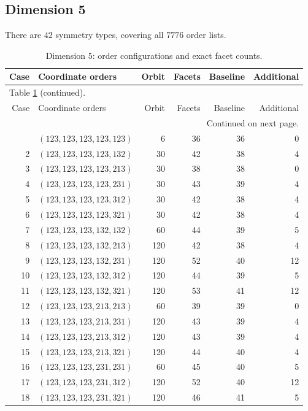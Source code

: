 \documentclass[a4paper,11pt]{amsart}
\numberwithin{equation}{section}
\theoremstyle{definition}
\theoremstyle{remark}
\begin{document}
\subsection{Dimension 5}\label{app:tables-n5}
There are $ 42$ symmetry types, covering all $ 7776$ order lists.
{\small\setlength{\tabcolsep}{4.5pt}
\begin{longtable}{@{}rlrrrr@{}}
\caption{Dimension $ 5$: order configurations and exact facet counts.}\label{tab:counts-n5}\\
\toprule
Case & Coordinate orders & Orbit & Facets & Baseline & Additional\\
\midrule\endfirsthead
\multicolumn{6}{l}{\small Table \ref{tab:counts-n5} (continued).}\\
\toprule
Case & Coordinate orders & Orbit & Facets & Baseline & Additional\\
\midrule\endhead
\midrule
\multicolumn{6}{r}{\small Continued on next page.}\\
\endfoot\bottomrule\endlastfoot
1 & $(123,123,123,123,123)$ & 6 & 36 & 36 & 0\\
2 & $(123,123,123,123,132)$ & 30 & 42 & 38 & 4\\
3 & $(123,123,123,123,213)$ & 30 & 38 & 38 & 0\\
4 & $(123,123,123,123,231)$ & 30 & 43 & 39 & 4\\
5 & $(123,123,123,123,312)$ & 30 & 42 & 38 & 4\\
6 & $(123,123,123,123,321)$ & 30 & 42 & 38 & 4\\
7 & $(123,123,123,132,132)$ & 60 & 44 & 39 & 5\\
8 & $(123,123,123,132,213)$ & 120 & 42 & 38 & 4\\
9 & $(123,123,123,132,231)$ & 120 & 52 & 40 & 12\\
10 & $(123,123,123,132,312)$ & 120 & 44 & 39 & 5\\
11 & $(123,123,123,132,321)$ & 120 & 53 & 41 & 12\\
12 & $(123,123,123,213,213)$ & 60 & 39 & 39 & 0\\
13 & $(123,123,123,213,231)$ & 120 & 43 & 39 & 4\\
14 & $(123,123,123,213,312)$ & 120 & 43 & 39 & 4\\
15 & $(123,123,123,213,321)$ & 120 & 44 & 40 & 4\\
16 & $(123,123,123,231,231)$ & 60 & 45 & 40 & 5\\
17 & $(123,123,123,231,312)$ & 120 & 52 & 40 & 12\\
18 & $(123,123,123,231,321)$ & 120 & 46 & 41 & 5\\

\end{longtable}}
\end{document}
